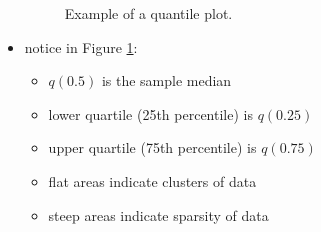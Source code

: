 \documentclass[10pt]{article}
\begin{document}
\begin{itemize}
\begin{figure}[h]
            \caption{Example of a quantile plot.}
            \label{fig:quantilePlot}
        \end{figure}
    \item notice in Figure \ref{fig:quantilePlot}:
        \begin{itemize}
            \item $q(0.5)$ is the sample median
            \item lower quartile (25th percentile) is $q(0.25)$ 
            \item upper quartile (75th percentile) is $q(0.75)$ 
            \item flat areas indicate clusters of data 
            \item steep areas indicate sparsity of data
        \end{itemize}
\end{itemize}
\end{document}

